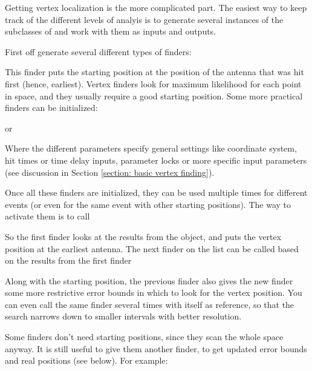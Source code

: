 \documentclass{article}
\newcommand{\class}[1]{\code{#1}}
\begin{document}
 Getting vertex localization is the more complicated part. 
 The easiest way to keep track of the different levels of analyis
 is to generate several instances of the subclasses of \class{VertexFinder} 
 and work with them as inputs and outputs. 
 
 First off generate several different types of finders:
 
 
 This finder puts the starting position at the position
 of the antenna that was hit first (hence, earliest). 
 Vertex finders look for maximum likelihood for each point in space, 
 and they usually require a good starting position. 
 Some more practical finders can be initialized:
 
 
 or
 
 
 Where the different parameters specify general settings like 
 coordinate system, hit times or time delay inputs, parameter locks
 or more specific input parameters (see discussion in Section \ref{section: basic vertex finding}).
 
 Once all these finders are initialized, they can be used multiple times
 for different events (or even for the same event with other starting positions). 
 The way to activate them is to call
 
 
 So the first finder looks at the results from the  object, 
 and puts the vertex position at the earliest antenna. 
 The next finder on the list can be called based on the results from the first finder
 
 
 Along with the starting position, the previous finder also
 gives the new finder some more restrictive error bounds 
 in which to look for the vertex position. 
 You can even call the same finder several times with itself as reference, 
 so that the search narrows down to smaller intervals with better resolution. 
 
 Some finders don't need starting positions, since they scan the whole space anyway. 
 It is still useful to give them another finder, to get updated error bounds and real positions (see below). 
 For example:
 
\end{document}
